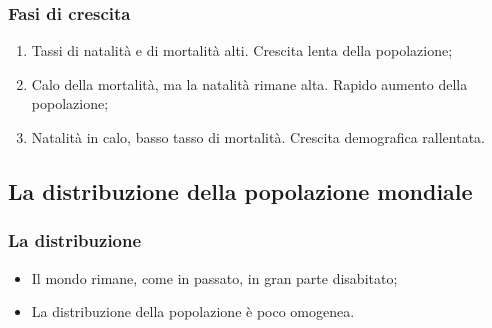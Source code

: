 \documentclass{article}
\begin{document}
\subsubsection{Fasi di crescita}
\begin{center}
\end{center}

\begin{enumerate}[label=\Roman*$^a$:]
    \item Tassi di natalità e di mortalità alti. Crescita lenta della popolazione;
    \item Calo della mortalità, ma la natalità rimane alta. Rapido aumento della popolazione;
    \item Natalità in calo, basso tasso di mortalità. Crescita demografica rallentata.
\end{enumerate}

\subsection{La distribuzione della popolazione mondiale}
\subsubsection{La distribuzione}
\begin{itemize}
    \item Il mondo rimane, come in passato, in gran parte disabitato;
    \item La distribuzione della popolazione è poco omogenea.
\end{itemize}
\pagebreak 
\end{document}
